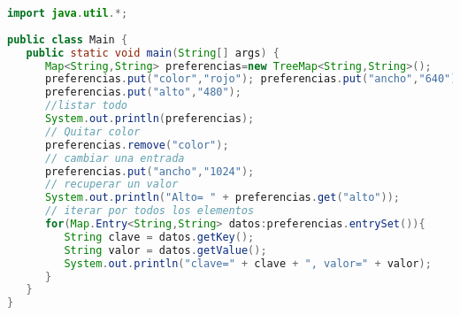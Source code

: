 \begin{lstlisting}[language=Java]
import java.util.*;
	
public class Main {
   public static void main(String[] args) {
      Map<String,String> preferencias=new TreeMap<String,String>();
      preferencias.put("color","rojo"); preferencias.put("ancho","640");
      preferencias.put("alto","480");
      //listar todo
      System.out.println(preferencias);
      // Quitar color
      preferencias.remove("color");
      // cambiar una entrada
      preferencias.put("ancho","1024");
      // recuperar un valor
      System.out.println("Alto= " + preferencias.get("alto"));
      // iterar por todos los elementos
      for(Map.Entry<String,String> datos:preferencias.entrySet()){
         String clave = datos.getKey();
         String valor = datos.getValue();
         System.out.println("clave=" + clave + ", valor=" + valor);
      }
   }
}
\end{lstlisting}